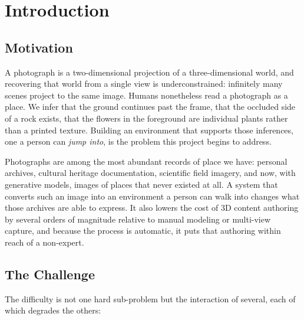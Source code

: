 \section{Introduction}

\subsection{Motivation}

A photograph is a two-dimensional projection of a three-dimensional world, and
recovering that world from a single view is underconstrained: infinitely many
scenes project to the same image.
Humans nonetheless read a photograph as a place. We infer that the ground
continues past the frame, that the occluded side of a rock exists, that the
flowers in the foreground are individual plants rather than a printed texture.
Building an environment that supports those inferences, one a person can
\emph{jump into}, is the problem this project begins to address.

Photographs are among the most abundant records of place we have: personal
archives, cultural heritage documentation, scientific field imagery, and now,
with generative models, images of places that never existed at all. A system that
converts such an image into an environment a person can walk into changes what
those archives are able to express. It also lowers the cost of 3D content
authoring by several orders of magnitude relative to manual modeling or
multi-view capture, and because the process is automatic, it puts that authoring
within reach of a non-expert.

\subsection{The Challenge}

The difficulty is not one hard sub-problem but the interaction of several, each
of which degrades the others:

